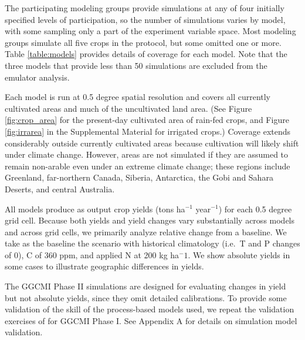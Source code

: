 \documentclass[preprint, 5p, times, twocolumn]{elsarticle}
\begin{document}
The participating modeling groups provide simulations at any of four initially specified levels of participation, so the number of simulations varies by model, with some sampling only a part of the experiment variable space. Most modeling groups simulate all five crops in the protocol, but some omitted one or more. Table \ref{table:models} provides details of coverage for each model. Note that the three models that provide less than 50 simulations are excluded from the emulator analysis. 

Each model is run at 0.5 degree spatial resolution and covers all currently cultivated areas and much of the uncultivated land area. (See Figure \ref{fig:crop_area} for the present-day cultivated area of rain-fed crops, and Figure \ref{fig:irrarea} in the Supplemental Material for irrigated crops.)  Coverage extends considerably outside currently cultivated areas because cultivation will likely shift under climate change.  However, areas are not simulated if they are assumed to remain non-arable even under an extreme climate change; these regions include Greenland, far-northern Canada, Siberia, Antarctica, the Gobi and Sahara Deserts, and central Australia.  

All models produce as output crop yields (tons ha$^{-1}$ year$^{-1}$) for each 0.5 degree grid cell. Because both yields and yield changes vary substantially across models and across grid cells, we primarily analyze relative change from a baseline. We take as the baseline the scenario with historical climatology (i.e.\ T and P changes of 0), C of 360 ppm, and applied N at 200 kg ha$^-1$. We show absolute yields in some cases to illustrate geographic differences in yields.

The GGCMI Phase II simulations are designed for evaluating changes in yield but not absolute yields, since they omit detailed calibrations.
To provide some validation of the skill of the process-based models used, we repeat the validation exercises of \citet{muller_global_2017} for GGCMI Phase I. See Appendix A for details on simulation model validation.
\end{document}
